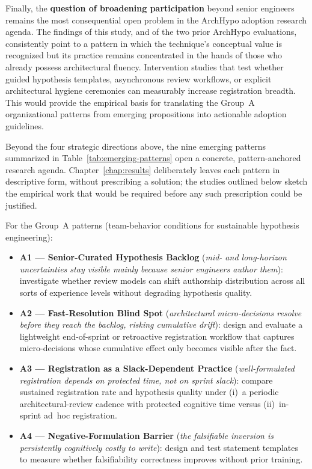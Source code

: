 Finally, the \textbf{question of broadening participation} beyond senior engineers
remains the most consequential open problem in the ArchHypo adoption research agenda.
The findings of this study, and of the two prior ArchHypo evaluations, consistently
point to a pattern in which the technique's conceptual value is recognized but its
practice remains concentrated in the hands of those who already possess architectural
fluency. Intervention studies that test whether guided hypothesis templates, asynchronous
review workflows, or explicit architectural hygiene ceremonies can measurably increase
registration breadth. This would provide the empirical basis for translating the Group~A
organizational patterns from emerging propositions into actionable adoption guidelines.

Beyond the four strategic directions above, the nine emerging patterns summarized
in Table~\ref{tab:emerging-patterns} open a concrete, pattern-anchored research
agenda. Chapter~\ref{chap:results} deliberately leaves each pattern
in descriptive form, without prescribing a solution; the studies outlined below
sketch the empirical work that would be required before any such prescription
could be justified.

For the Group~A patterns (team-behavior conditions for sustainable hypothesis
engineering):

\begin{itemize}
  \item \textbf{A1 --- Senior-Curated Hypothesis Backlog}
    (\emph{mid- and long-horizon uncertainties stay visible mainly because
    senior engineers author them}): investigate whether review models can shift
    authorship distribution across all sorts of experience levels without degrading
    hypothesis quality.
  \item \textbf{A2 --- Fast-Resolution Blind Spot}
    (\emph{architectural micro-decisions resolve before they reach the
    backlog, risking cumulative drift}): design and evaluate a lightweight
    end-of-sprint or retroactive registration workflow that captures
    micro-decisions whose cumulative effect only becomes visible after the
    fact.
  \item \textbf{A3 --- Registration as a Slack-Dependent Practice}
    (\emph{well-formulated registration depends on protected time, not on
    sprint slack}): compare sustained registration rate and hypothesis
    quality under (i)~a periodic architectural-review cadence with protected
    cognitive time versus (ii)~in-sprint ad~hoc registration.
  \item \textbf{A4 --- Negative-Formulation Barrier}
    (\emph{the falsifiable inversion is persistently cognitively costly to
    write}): design and test statement templates to measure whether
    falsifiability correctness improves without prior training.
\end{itemize}

